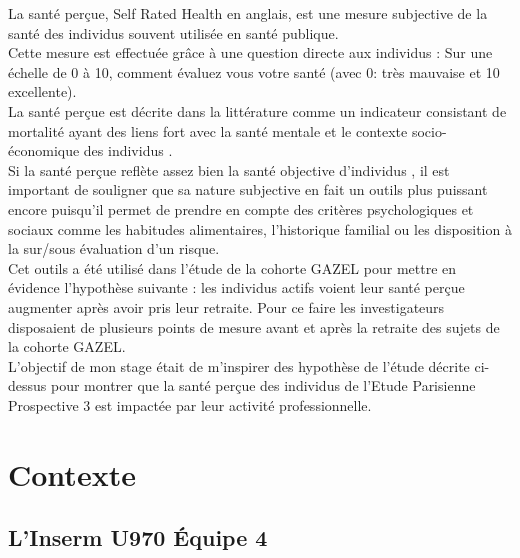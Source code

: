 \documentclass{book}
\begin{document}
\noindent
La santé perçue, Self Rated Health en anglais, est une mesure subjective de la santé des individus souvent utilisée en santé publique.\\
Cette mesure est effectuée grâce à une question directe aux individus : Sur une échelle de 0 à 10, comment évaluez vous votre santé (avec 0: très mauvaise et 10 excellente).\\
La santé perçue est décrite dans la littérature comme un indicateur consistant de mortalité\cite{mossey_self-rated_1982} \cite{crossley_reliability_2002} ayant des liens fort avec la santé mentale \cite{millan-calenti_depressive_2012} et le contexte socio-économique des individus \cite{mansyur_social_2008} \cite{alvarez-galvez_impact_2013}.\\
Si la santé perçue reflète assez bien la santé objective d'individus \cite{wu_relationship_2013} , il est important de souligner que sa nature subjective en fait un outils plus puissant encore puisqu'il permet de prendre en compte des critères psychologiques et sociaux comme les habitudes alimentaires, l'historique familial ou les disposition à la sur/sous évaluation d'un risque.\\

\noindent
Cet outils a été utilisé dans l'étude de la cohorte GAZEL pour mettre en évidence l'hypothèse suivante\cite{westerlund_self-rated_2009}  : les individus actifs voient leur santé perçue augmenter après avoir pris leur retraite. Pour ce faire les investigateurs disposaient de plusieurs points de mesure avant et après la retraite des sujets de la cohorte GAZEL.\\

\noindent
L'objectif de mon stage était de m'inspirer des hypothèse de l'étude décrite ci-dessus pour montrer que la santé perçue des individus de l'Etude Parisienne Prospective 3 \cite{empana_paris_2011} est impactée par leur activité professionnelle.\\



\newpage
\section{Contexte}
\subsection{L'Inserm U970 Équipe 4}
\end{document}
